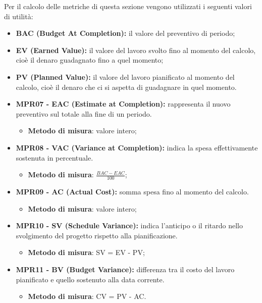 Per il calcolo delle metriche di questa sezione vengono utilizzati i seguenti valori di utilità:
\begin{itemize}
    \item \textbf{BAC (Budget At Completion):} il valore del preventivo di periodo;
    \item \textbf{EV (Earned Value):}  il valore del lavoro svolto fino al momento del calcolo, cioè il denaro guadagnato fino a quel momento;
    \item \textbf{PV (Planned Value):} il valore del lavoro pianificato al momento del calcolo, cioè il denaro che ci si aspetta di guadagnare in quel momento.
\end{itemize}
\begin{itemize}
    \item \textbf{MPR07 - EAC (Estimate at Completion):} rappresenta il nuovo preventivo sul totale alla fine di un periodo.
          \begin{itemize}
              \item
                    \textbf{Metodo di misura}: valore intero;
          \end{itemize}
    \item \textbf{MPR08 - VAC (Variance at Completion):} indica la spesa effettivamente sostenuta in percentuale.
          \begin{itemize}
              \item \textbf{Metodo di misura}: $\frac{BAC - EAC}{100}$;
          \end{itemize}
    \item \textbf{MPR09 - AC (Actual Cost):} somma spesa fino al momento del calcolo.
          \begin{itemize}
              \item
                    \textbf{Metodo di misura}: valore intero;
          \end{itemize}
    \item \textbf{MPR10 - SV (Schedule Variance):} indica l'anticipo o il ritardo nello svolgimento del progetto rispetto alla pianificazione.\begin{itemize}
              \item
                    \textbf{Metodo di misura}: SV = EV - PV;
          \end{itemize}
    \item \textbf{MPR11 - BV (Budget Variance):} differenza tra il costo del lavoro pianificato e quello sostenuto alla data corrente.\begin{itemize}
              \item
                    \textbf{Metodo di misura}: CV = PV - AC.
          \end{itemize}
\end{itemize}
